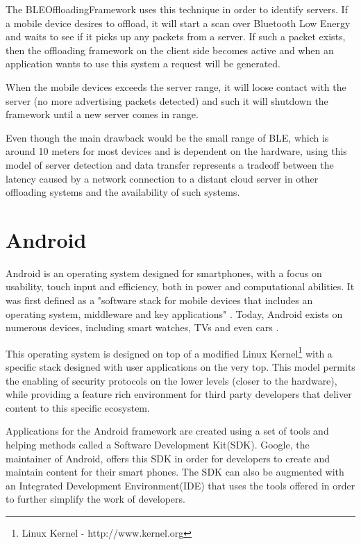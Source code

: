 The BLEOffloadingFramework uses this technique in order to identify servers. If a mobile device desires to offload, it will start a scan over Bluetooth Low Energy and waits to see if it picks up any packets from a server. If such a packet exists, then the offloading framework on the client side becomes active and when an application wants to use this system a request will be generated.

When the mobile devices exceeds the server range, it will loose contact with the server (no more advertising packets detected) and such it will shutdown the framework until a new server comes in range.

Even though the main drawback would be the small range of BLE, which is around 10 meters for most devices and is dependent on the hardware, using this model of server detection and data transfer represents a tradeoff between the latency caused by a network connection to a distant cloud server in other offloading systems and the availability of such systems.

\section{Android}
\label{android}

Android is an operating system designed for smartphones, with a focus on usability, touch input and efficiency, both in power and computational abilities. It was first defined as a "software stack for mobile devices that includes an operating system, middleware and key applications" \cite{developers2011android}. Today, Android exists on numerous devices, including smart watches, TVs and even cars \cite{androidwiki}.

This operating system is designed on top of a modified Linux Kernel\footnote{Linux Kernel - http://www.kernel.org} with a specific stack designed with user applications on the very top. This model permits the enabling of security protocols on the lower levels (closer to the hardware), while providing a feature rich environment for third party developers that deliver content to this specific ecosystem.

Applications for the Android framework are created using a set of tools and helping methods called a Software Development Kit(SDK). Google, the maintainer of Android, offers this SDK in order for developers to create and maintain content for their smart phones. The SDK can also be augmented with an Integrated Development Environment(IDE) that uses the tools offered in order to further simplify the work of developers.

